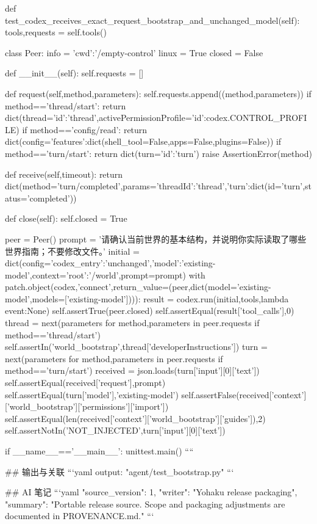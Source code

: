     def test_codex_receives_exact_request_bootstrap_and_unchanged_model(self):
        tools,requests = self.tools()

        class Peer:
            info = {'cwd':'/empty-control'}
            linux = True
            closed = False

            def __init__(self):
                self.requests = []

            def request(self,method,parameters):
                self.requests.append((method,parameters))
                if method=='thread/start':
                    return dict(thread={'id':'thread'},activePermissionProfile={'id':codex.CONTROL_PROFILE})
                if method=='config/read':
                    return dict(config={'features':dict(shell_tool=False,apps=False,plugins=False)})
                if method=='turn/start':
                    return dict(turn={'id':'turn'})
                raise AssertionError(method)

            def receive(self,timeout):
                return dict(method='turn/completed',params={'threadId':'thread','turn':dict(id='turn',status='completed')})

            def close(self):
                self.closed = True

        peer = Peer()
        prompt = '请确认当前世界的基本结构，并说明你实际读取了哪些世界指南；不要修改文件。'
        initial = dict(config={'codex_entry':'unchanged','model':'existing-model'},context={'root':'/world'},prompt=prompt)
        with patch.object(codex,'connect',return_value=(peer,dict(model='existing-model',models=['existing-model']))):
            result = codex.run(initial,tools,lambda event:None)
        self.assertTrue(peer.closed)
        self.assertEqual(result['tool_calls'],0)
        thread = next(parameters for method,parameters in peer.requests if method=='thread/start')
        self.assertIn('world_bootstrap',thread['developerInstructions'])
        turn = next(parameters for method,parameters in peer.requests if method=='turn/start')
        received = json.loads(turn['input'][0]['text'])
        self.assertEqual(received['request'],prompt)
        self.assertEqual(turn['model'],'existing-model')
        self.assertFalse(received['context']['world_bootstrap']['permissions']['import'])
        self.assertEqual(len(received['context']['world_bootstrap']['guides']),2)
        self.assertNotIn('NOT_INJECTED',turn['input'][0]['text'])


if __name__=='__main__':
    unittest.main()
````

## 输出与关联
```yaml
output: "agent/test_bootstrap.py"
```

## AI 笔记
```yaml
{"source_version": 1, "writer": "Yohaku release packaging", "summary": "Portable release source. Scope and packaging adjustments are documented in PROVENANCE.md."}
```
